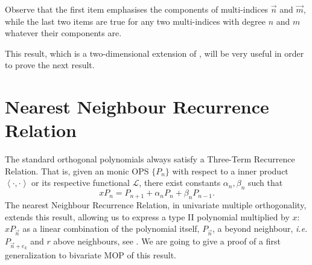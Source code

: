 \documentclass[12pt,a4]{report}
\theoremstyle{plain}
\newcommand{\prodesc}[2]{\left\langle #1 , #2 \right\rangle}
\begin{document}
Observe that the first item emphasises the components of multi-indices $\vec n$ and $\vec m$, while the last two items are true for any two multi-indices with degree $n$ and $m$ whatever their components are.

This result, which is a two-dimensional extension of \cite[Theorem 23.1.6]{Ismail}, will be very useful in order to prove the next result.


\section{Nearest Neighbour Recurrence Relation}

The standard orthogonal polynomials always satisfy a Three-Term Recurrence Relation. That is, given an monic OPS $\{P_n\}$ with respect to a inner product $\prodesc{\cdot}{\cdot}$ or its respective functional $\mathcal L$, there exist constants $\alpha_n,\beta_n$ such that
$$
xP_n = P_{n+1}+ \alpha_n P_n + \beta_n P_{n-1}.
$$
The nearest Neighbour Recurrence Relation, in univariate multiple orthogonality, extends this result, allowing us to express a type II polynomial multiplied by $x$: $xP_{\vec n}$ as a linear combination of the polynomial itself, $P_{\vec n}$, a beyond neighbour, \textit{i.e.} $P_{\vec n + e_k}$ and $r$ above neighbours, see \cite[Theorem 23.1.7]{Ismail}. We are going to give a proof of a first generalization to bivariate MOP of this result. 
\end{document}
